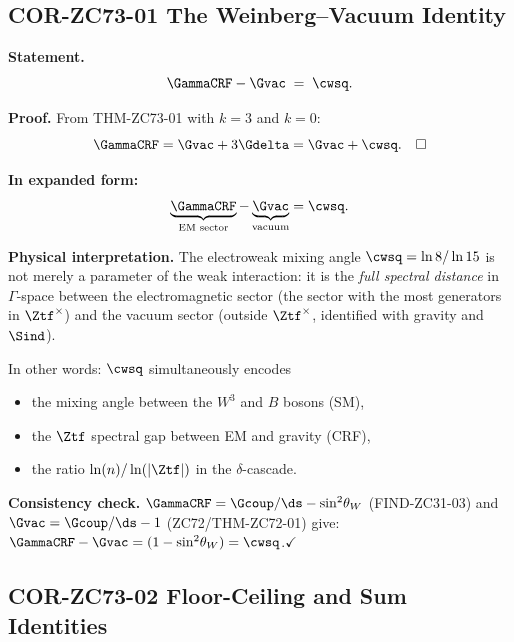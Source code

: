 \documentclass[12pt, a4paper]{article}
\renewcommand{\swsq}{\sin^2\!\theta_W}
\begin{document}
\subsection{COR-ZC73-01 \quad The Weinberg--Vacuum Identity}
\label{sec:cor01}


\begin{formalbox}[title={COR-ZC73-01: Weinberg--Vacuum Identity
  $\GammaCRF - \Gvac = \cwsq$ ($R_0$, Exact)}]
\textbf{Statement.}
\[
  \GammaCRF - \Gvac \;=\; \cwsq.
\]

\textbf{Proof.}
From THM-ZC73-01 with $k=3$ and $k=0$:
\[
  \GammaCRF = \Gvac + 3\Gdelta = \Gvac + \cwsq. \quad\square
\]

\textbf{In expanded form:}
\[
  \underbrace{\GammaCRF}_{\text{EM sector}} - \underbrace{\Gvac}_{\text{vacuum}}
  = \cwsq.
\]

\textbf{Physical interpretation.}
The electroweak mixing angle $\cwsq = \ln8/\ln15$ is not merely
a parameter of the weak interaction: it is the \emph{full spectral
distance} in $\Gamma$-space between the electromagnetic sector
(the sector with the most generators in $\Ztf^\times$)
and the vacuum sector (outside $\Ztf^\times$, identified
with gravity and $\Sind$).

In other words: $\cwsq$ simultaneously encodes
\begin{itemize}[leftmargin=2em, noitemsep]
  \item the mixing angle between the $W^3$ and $B$ bosons (SM),
  \item the $\Ztf$ spectral gap between EM and gravity (CRF),
  \item the ratio $\ln(n)/\ln(|\Ztf|)$ in the $\delta$-cascade.
\end{itemize}

\textbf{Consistency check.}
$\GammaCRF = \Gcoup/\ds - \swsq$ (FIND-ZC31-03) and
$\Gvac = \Gcoup/\ds - 1$ (ZC72/THM-ZC72-01) give:
$\GammaCRF - \Gvac = (1-\swsq) = \cwsq$.\hfill$\checkmark$
\end{formalbox}

\subsection{COR-ZC73-02 \quad Floor-Ceiling and Sum Identities}
\label{sec:cor02}
\end{document}
